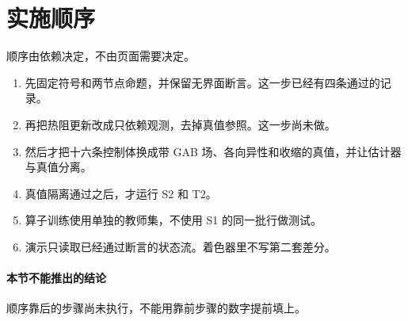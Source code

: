 \section{实施顺序}

顺序由依赖决定，不由页面需要决定。

\begin{enumerate}
\item 先固定符号和两节点命题，并保留无界面断言。这一步已经有四条通过的记录。
\item 再把热阻更新改成只依赖观测，去掉真值参照。这一步尚未做。
\item 然后才把十六条控制体换成带 GAB 场、各向异性和收缩的真值，并让估计器与真值分离。
\item 真值隔离通过之后，才运行 S2 和 T2。
\item 算子训练使用单独的教师集，不使用 S1 的同一批行做测试。
\item 演示只读取已经通过断言的状态流。着色器里不写第二套差分。
\end{enumerate}

\paragraph{本节不能推出的结论}
顺序靠后的步骤尚未执行，不能用靠前步骤的数字提前填上。
